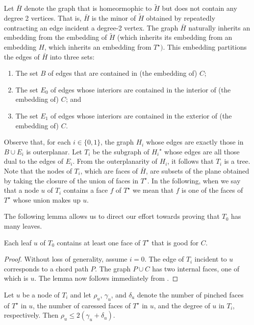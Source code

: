 \documentclass{patmorin}
\newcommand{\dual}[1]{{#1}^\star}
\begin{document}
Let $\bar{H}$ denote the graph that is homeormophic to $\tilde{H}$ but does not
contain any degree 2 vertices.  That is, $\bar{H}$ is the minor of $\tilde{H}$
obtained by repeatedly contracting an edge incident a degree-2 vertex.
The graph $\bar{H}$ naturally inherits an embedding from the embedding of $\tilde{H}$ (which inherits its embedding from an embedding $H$, which inherits an embedding from $\dual{T})$.  This embedding partitions the edges of $\bar{H}$ into three sets:
\begin{enumerate}
  \item The set $B$ of edges that are contained in (the embedding of) $C$;
  \item The set $E_0$ of edges whose interiors are contained in the interior of (the embedding of) $C$; and
  \item The set $E_1$ of edges whose interiors are contained in the exterior of (the embedding of) $C$.
\end{enumerate}

Observe that, for each $i\in\{0,1\}$, the graph $H_i$ whose edges are
exactly those in $B\cup E_i$ is outerplanar.  Let $T_i$ be the subgraph of
$\dual{H_i}$ whose edges are all those dual to the edges of $E_i$. From
the outerplanarity of $H_i$, it follows that $T_i$ is a tree. Note that
the nodes of $T_i$, which are faces of $\bar{H}$, are subsets of the
plane obtained by taking the closure of the union of faces in $\dual{T}$.
In the following, when we say that a node $u$ of $T_i$ contains a face
$f$ of $\dual{T}$ we mean that $f$ is one of the faces of $\dual{T}$
whose union makes up $u$.


The following lemma allows us to direct our effort towards proving that
$T_0$ has many leaves.

\begin{lem}
   Each leaf $u$ of $T_0$ contains at least one face of $\dual{T}$
   that is good for $C$.
\end{lem}

\begin{proof}
   Without loss of generality, assume $i=0$.  The edge of $T_i$ incident
   to $u$ corresponds to a chord path $P$. The graph $P\cup C$ has two
   internal faces, one of which is $u$.  The lemma now follows immediately
   from .
\end{proof}


\begin{lem}
   Let $u$ be a node of $T_i$ and let $\rho_u$, $\gamma_u$, and $\delta_u$ denote the number of pinched faces of $\dual{T}$ in $u$, the number of caressed faces of $\dual{T}$ in $u$, and the degree of $u$ in $T_i$, respectively.  Then $\rho_u \le 2(\gamma_u+\delta_u)$.
\end{lem}
\end{document}
